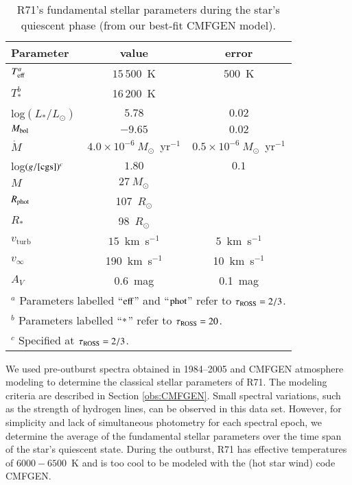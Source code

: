 \documentclass[structabstract]{aa}
\begin{document}
\begin{table}
\caption{R71's fundamental stellar parameters during the star's quiescent phase (from our best-fit CMFGEN model). \label{table:parameters_quiescense}}
\begin{tabular}{lcc}
\hline\hline
Parameter &  value & error  \\ %
\hline
$T_\textnormal{\scriptsize{eff}}^a$	&   $15\,500$~K & $500$~K\\
$T_{*}^b$	&  16\,200~K	\\
log$(L_{*}/L_{\odot})$	&   $5.78$ &$0.02$ \\
$M_\textnormal{\scriptsize{bol}}$	&   $-9.65$ & $0.02$ \\
$\dot{M}$	 & $4.0 \times 10^{-6}~M_{\odot}$~yr$^{-1}$ & $0.5 \times 10^{-6}~M_{\odot}$~yr$^{-1}$ \\
log$(g/\textnormal{[cgs]})^c$ &	 $1.80$ & $0.1$ \\
$M$	& $27~M_{\odot}$ \\
$R_\textnormal{\scriptsize{phot}}$	&  107~$R_{\odot}$ \\
$R_{*}$	&  98~$R_{\odot}$ \\
$v_\mathrm{turb}$	&   $15$~km~s$^{-1}$ & $5$~km~s$^{-1}$ \\
$v_{\infty}$	&   190~km~s$^{-1}$ &  10~km~s$^{-1}$\\
$A_{V}$	&   0.6~mag & 0.1~mag\\
\hline
\multicolumn{3}{l}{$^a$ Parameters labelled ``$\textnormal{{eff}}$'' and ``$\textnormal{{phot}}$'' refer to $\tau_\textnormal{\scriptsize{ROSS}} = 2/3$.} \\
\multicolumn{3}{l}{$^b$ Parameters labelled ``$\textnormal{{*}}$'' refer to $\tau_\textnormal{\scriptsize{ROSS}} = 20$.} \\
\multicolumn{3}{l}{$^c$ Specified at $\tau_\textnormal{\scriptsize{ROSS}} = 2/3$.} \\
\end{tabular}
\end{table}


We used pre-outburst spectra obtained in 1984--2005 and CMFGEN atmosphere modeling to determine the classical stellar parameters of R71. The modeling criteria are described in Section \ref{obs:CMFGEN}. Small spectral variations, such as the strength of hydrogen lines, can be observed in this data set. However, for simplicity and lack of simultaneous photometry for each spectral epoch, we determine the average of the fundamental stellar parameters over the time span of the star's quiescent state. During the outburst, R71 has effective temperatures of $6000-6500$~K and is too cool to be modeled with the (hot star wind) code CMFGEN. 
\end{document}
